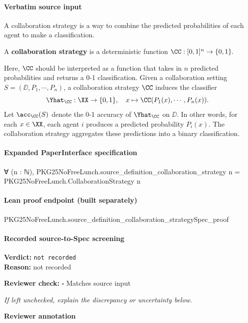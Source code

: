 \documentclass[10pt]{article}
\newcommand{\reviewerbox}{%
  \par\noindent\fbox{\parbox{0.96\linewidth}{\rule{0pt}{0.38in}}}\par
}
\newcommand{\reviewmatch}[1]{%
  \par\noindent\textbf{Reviewer check:} $\square$\; #1\par
  \noindent\emph{If left unchecked, explain the discrepancy or uncertainty below.}\par
}
\begin{document}
\paragraph{Verbatim source input}
\begin{ReviewVerbatim}
A collaboration strategy is a way to combine the predicted probabilities of each agent to make a classification.
\begin{definition}
A \textbf{collaboration strategy} is a deterministic function $\CC: [0,1]^n \rightarrow \{0,1\}.$
\end{definition}
Here, $\CC$ should be interpreted as a function that takes in $n$ predicted probabilities and returns a 0-1 classification. Given a collaboration setting $S=(\DD, P_1, \cdots, P_n)$, a collaboration strategy $\CC$ induces the classifier
\begin{equation}
    \Yhat_\CC: \XX \rightarrow \{0,1\},\quad x \mapsto \CC(P_1(x),\cdots,P_n(x)).
\end{equation}
Let $\acc_\CC(S)$ denote the 0-1 accuracy of $\Yhat_\CC$ on $\DD$. In other words, for each $x\in \XX$, each agent $i$ produces a predicted probability $P_i(x).$ The collaboration strategy aggregates these predictions into a binary classification.
\end{ReviewVerbatim}


\paragraph{Expanded PaperInterface specification}
\begin{ReviewVerbatim}
∀ (n : ℕ), PKG25NoFreeLunch.source_definition_collaboration_strategy n = PKG25NoFreeLunch.CollaborationStrategy n
\end{ReviewVerbatim}

\paragraph{Lean proof endpoint (built separately)}\begin{ReviewVerbatim}
PKG25NoFreeLunch.source_definition_collaboration_strategySpec_proof
\end{ReviewVerbatim}

\paragraph{Recorded source-to-Spec screening}
\textbf{Verdict:} \texttt{not recorded}
\\
\textbf{Reason:} not recorded
\reviewmatch{Matches source input}
\noindent\textbf{Reviewer annotation}\par
\reviewerbox
\clearpage
\hypertarget{source-claim-075776b0c6d0a991}{}
\end{document}
